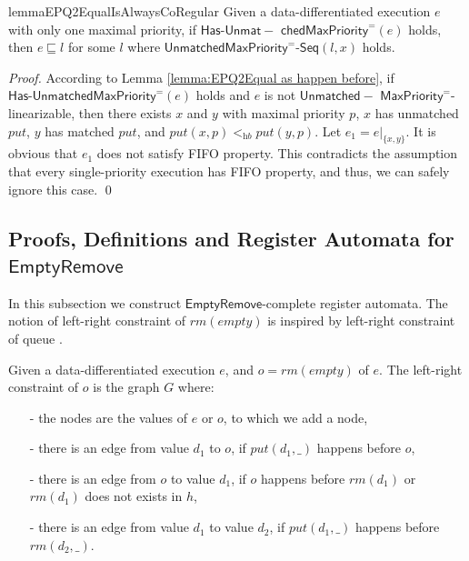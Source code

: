 \begin{restatable}{lemma}{EPQ2EqualIsAlwaysCoRegular}
\label{lemma:EPQ2Equal is always co-regular}
Given a data-differentiated execution $e$ with only one maximal priority, if $\mathsf{Has\text{-}}\mathsf{Unmat-}$ $\mathsf{chedMaxPriority}^{=}(e)$ holds, then $e \sqsubseteq l$ for some $l$ where $\mathsf{UnmatchedMaxPriority}^{=}\mathsf{\text{-}Seq}(l,x)$ holds.
\end{restatable}

\begin {proof}

According to Lemma \ref{lemma:EPQ2Equal as happen before}, if $\mathsf{Has\text{-}}\mathsf{UnmatchedMaxPriority}^{=}(e)$ holds and $e$ is not $\mathsf{Unmatched-}$ $\mathsf{MaxPriority}^{=}$-linearizable, then there exists $x$ and $y$ with maximal priority $p$, $x$ has unmatched $\textit{put}$, $y$ has matched $\textit{put}$, and $\textit{put}(x,p) <_{\textit{hb}} \textit{put}(y,p)$. Let $e_1 = e \vert_{ \{ x,y \} }$. It is obvious that $e_1$ does not satisfy FIFO property. This contradicts the assumption that every single-priority execution has FIFO property, and thus, we can safely ignore this case. \qed
\end {proof}




\subsection{Proofs, Definitions and Register Automata for $\mathsf{EmptyRemove}$}
\label{subsec:co-regular of EPQ3}

In this subsection we construct $\mathsf{EmptyRemove}$-complete register automata. The notion of left-right constraint of $\textit{rm}(\textit{empty})$ is inspired by left-right constraint of queue \cite{DBLP:conf/icalp/BouajjaniEEH15}.

\begin{definition}\label{def:left-right constraint for rmEmpty operation}
Given a data-differentiated execution $e$, and $o = \textit{rm}(\textit{empty})$ of $e$. The left-right constraint of $o$ is the graph $G$ where:

\begin{itemize}
\setlength{\itemsep}{0.5pt}
\item[-] the nodes are the values of $e$ or $o$, to which we add a node,

\item[-] there is an edge from value $d_1$ to $o$, if $\textit{put}(d_1,\_)$ happens before $o$,

\item[-] there is an edge from $o$ to value $d_1$, if $o$ happens before $\textit{rm}(d_1)$ or $\textit{rm}(d_1)$ does not exists in $h$,

\item[-] there is an edge from value $d_1$ to value $d_2$, if $\textit{put}(d_1,\_)$ happens before $\textit{rm}(d_2,\_)$.
\end{itemize}
\end{definition}


